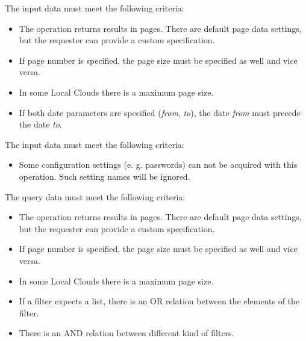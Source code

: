 \documentclass[a4paper]{arrowhead}
\begin{document}

The input data must meet the following criteria:

\begin{itemize}
    \item The operation returns results in pages. There are default page data settings, but the requester can provide a custom specification.
    \item If page number is specified, the page size must be specified as well and vice versa.
    \item In some Local Clouds there is a maximum page size.
    \item If both date parameters are specified (\textit{from}, \textit{to}), the date \textit{from} must precede the date \textit{to}.
\end{itemize}


The input data must meet the following criteria:

\begin{itemize}
    \item Some configuration settings (e. g. passwords) can not be acquired with this operation. Such setting names will be ignored.
\end{itemize}


The query data must meet the following criteria:

\begin{itemize}
    \item The operation returns results in pages. There are default page data settings, but the requester can provide a custom specification.
    \item If page number is specified, the page size must be specified as well and vice versa.
    \item In some Local Clouds there is a maximum page size.
    \item If a filter expects a list, there is an OR relation between the elements of the filter.
    \item There is an AND relation between different kind of filters.
\end{itemize}

\end{document}
